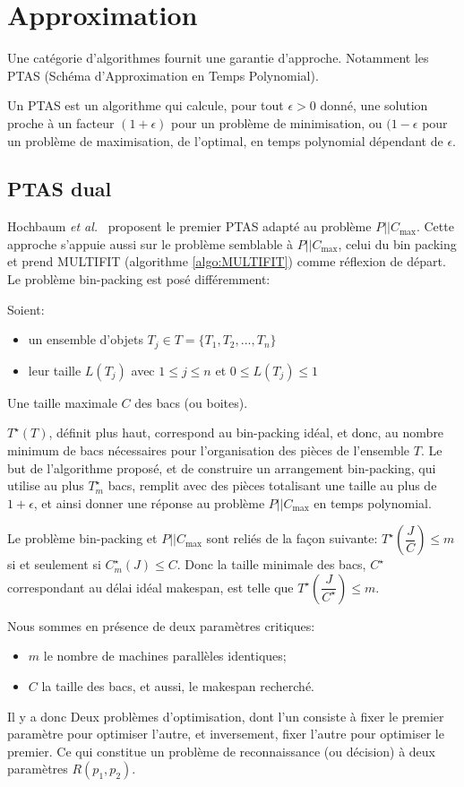 \documentclass[a4paper,12pt]{report}
\theoremstyle{plain}				%
\theoremstyle{definition}				%
\newcommand\problemGrahamP{$P||C_{\max}$\xspace}
\begin{document}
\section{Approximation}

Une catégorie d'algorithmes fournit une garantie d'approche.
Notamment les PTAS (Schéma d'Approximation en Temps Polynomial).

Un PTAS est un algorithme qui calcule, pour tout $\epsilon > 0$ donné,
une solution proche à un facteur $(1+\epsilon)$ pour un problème de
minimisation, ou $(1-\epsilon$ pour un problème de maximisation, de
l'optimal, en temps polynomial dépendant de $\epsilon$.


\subsection{PTAS dual} %

Hochbaum \emph{et al.}\ \cite{hochbaum1987using} proposent le
premier PTAS adapté au problème \problemGrahamP.
Cette approche s'appuie aussi sur le problème semblable à
\problemGrahamP, celui du bin packing et prend MULTIFIT
(algorithme \ref{algo:MULTIFIT}) comme réflexion de départ.
Le problème bin-packing est posé différemment:

Soient:
\begin{itemize}
\item un ensemble d'objets $T_j \in T = \{T_1, T_2, ..., T_n\}$
\item leur taille $L(T_j)$ avec $1 \le j \le n$ et $0 \le L(T_j) \le 1$
\end{itemize}
Une taille maximale $C$ des bacs (ou boites).

$T^{\star}(T)$, définit plus haut, correspond au bin-packing idéal, et donc,
au nombre minimum de bacs nécessaires pour l'organisation des pièces de l'ensemble $T$.
Le but de l'algorithme proposé, et de construire un arrangement bin-packing,
qui utilise au plus $T^{\star}_m$ bacs, remplit
avec des pièces totalisant une taille au plus de $1+ \epsilon$,
et ainsi donner une réponse au problème \problemGrahamP en temps polynomial.

Le problème bin-packing et \problemGrahamP sont reliés de la façon suivante:
$T^{\star}(\dfrac{J}{C}) \le m$ si et seulement si $C^{\star}_m(J) \le C$.
Donc la taille minimale des bacs, $C^{\star}$ correspondant au délai idéal makespan, est telle que $T^{\star}(\dfrac{J}{C^{\star}}) \le m$.

Nous sommes en présence de deux paramètres critiques:
\begin{itemize}
\item $m$ le nombre de machines parallèles identiques;
\item $C$ la taille des bacs, et aussi, le makespan recherché.
\end{itemize}
Il y a donc Deux problèmes d'optimisation,
dont l'un consiste à fixer le premier paramètre pour optimiser l'autre,
et inversement, fixer l'autre pour optimiser le premier.
Ce qui constitue un problème de reconnaissance (ou décision) à deux paramètres $R(p_1, p_2)$.
\end{document}
